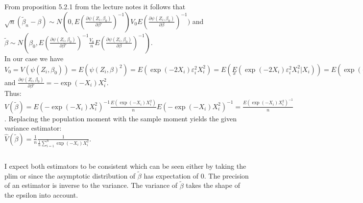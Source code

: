 \documentclass[11pt]{article}
\theoremstyle{break}
\begin{document}
\subsection{}
From proposition 5.2.1 from the lecture notes it follows that $\sqrt{n}(\tilde{\beta}_n-\beta) \sim N(0, E(\frac{\partial \psi(Z_i, \beta_0)}{\partial \beta'})^{-1})V_0 E(\frac{\partial \psi(Z_i, \beta_0)}{\partial \beta})^{-1})$
and $\tilde{\beta} \sim N(\beta_0, E(\frac{\partial \psi(Z_i, \beta_0)}{\partial \beta'})^{-1}\frac{V_0}{n} E(\frac{\partial \psi(Z_i, \beta_0)}{\partial \beta})^{-1})$. \\

In our case we have $V_0 = V(\psi(Z_i, \beta_0)) = E(\psi(Z_i, \beta)^2) = E(\exp(-2X_i)\varepsilon_i^2X_i^2) = E(\underset{x}{E}(\exp(-2X_i)\varepsilon_i^2X_i^2|X_i)) = E(\exp(-2X_i)X_i^2\underset{x}{E}(\varepsilon_i^2|X_i)) = E(\exp(-X_i)X_i^2)$ and $\frac{\partial \psi(Z_i, \beta_0)}{\partial \beta'} = -\exp(-X_i)X_i^2$. \\
Thus: \\
$V(\tilde{\beta}) = E(-\exp(-X_i)X_i^2)^{-1}\frac{E(\exp(-X_i)X_i^2)}{n}E(-\exp(-X_i)X_i^2)^{-1} = \frac{E(\exp(-X_i)X_i^2)^{-1}}{n}$. Replacing the population moment with the sample moment yields the given variance estimator: \\
$\hat{V}(\tilde{\beta}) = \frac{1}{n}\frac{1}{\frac{1}{n} \sum_{i=1}^n\exp(-X_i)X_i^2}$.

\subsection{}
I expect both estimators to be consistent which can be seen either by taking the plim or since the asymptotic distribution of $\tilde{\beta}$ has expectation of $0$. The precision of an estimator is inverse to the variance. The variance of $\tilde{\beta}$ takes the shape of the epsilon into account.
\end{document}
